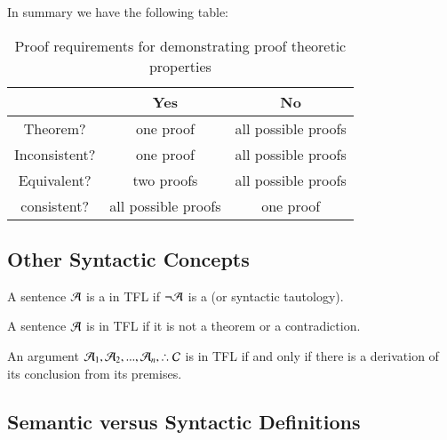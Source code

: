 \documentclass[12pt, a4paper, twoside, openright, titlepage]{book}
\begin{document}
In summary we have the following table:

\begin{table}[H]
    \centering
    \caption{Proof requirements for demonstrating proof theoretic properties}
    \begin{tabular}{c|cc}
        & \textbf{Yes} & \textbf{No} \\ \hline
        Theorem? & one proof & all possible proofs \\
        Inconsistent? & one proof & all possible proofs \\
        Equivalent? & two proofs & all possible proofs \\
        consistent? & all possible proofs & one proof 
    \end{tabular}
\end{table}


\subsection{\textsection Other Syntactic Concepts}

\begin{defn}{}{}
    A sentence $\mathcal{A}$ is a  in TFL if $\neg\mathcal{A}$ is a  (or syntactic tautology).
\end{defn}

\begin{defn}{}{}
    A sentence $\mathcal{A}$ is  in TFL if it is not a theorem or a contradiction.
\end{defn}

\begin{defn}{}{}
    An argument $\metav{A}_1,\metav{A}_2,...,\metav{A}_n,\therefore \metav{C}$ is  in TFL if and only if there is a derivation of its conclusion from its premises.
\end{defn}

\subsection{\textsection Semantic versus Syntactic Definitions}
\end{document}
